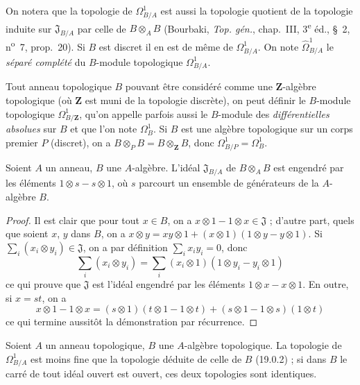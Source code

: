 On notera que la topologie de $\Omega^1_{B/A}$ est aussi la topologie quotient
de la topologie induite sur $\mathfrak{J}_{B/A}$ par celle de
$B\otimes_A B$ (Bourbaki, \emph{Top. gén.}, chap.~III, 3\textsuperscript{e}
éd., §~2, n\textsuperscript{o}~7, prop.~20). Si $B$ est discret il en est de
même de $\Omega^1_{B/A}$. On note $\widehat{\Omega}^1_{B/A}$ le
\emph{séparé complété} du $B$-module topologique $\Omega^1_{B/A}$.

Tout anneau topologique $B$ pouvant être considéré comme une
$\mathbf{Z}$-algèbre topologique (où $\mathbf{Z}$ est muni de la topologie
discrète), on peut définir le $B$-module topologique $\Omega^1_{B/\mathbf{Z}}$,
qu'on appelle parfois aussi le $B$-module des \emph{différentielles absolues}
sur $B$ et que l'on note $\Omega^1_B$. Si $B$ est une algèbre topologique sur
un corps premier $P$ (discret), on a
$B\otimes_P B=B\otimes_{\mathbf{Z}}B$, donc
$\Omega^1_{B/P}=\Omega^1_B$.

\begin{lemma}[20.4.4]
\label{0.20.4.4-fr}
Soient $A$ un anneau, $B$ une $A$-algèbre. L'idéal $\mathfrak{J}_{B/A}$ de
$B\otimes_A B$ est engendré par les éléments $1\otimes s-s\otimes1$, où $s$
parcourt un ensemble de générateurs de la $A$-algèbre $B$.
\end{lemma}

\begin{proof}
Il est clair que pour tout $x\in B$, on a
$x\otimes1-1\otimes x\in\mathfrak{J}$ ; d'autre part, quels que soient $x$,
$y$ dans $B$, on a
$x\otimes y=xy\otimes1+(x\otimes1)(1\otimes y-y\otimes1)$. Si
$\sum_i(x_i\otimes y_i)\in\mathfrak{J}$, on a par définition
$\sum_i x_i y_i=0$, donc
\begin{equation}
\tag{20.4.4.1}
\label{0.20.4.4.1-fr}
  \sum_i(x_i\otimes y_i)=
  \sum_i(x_i\otimes1)(1\otimes y_i-y_i\otimes1)
\end{equation}
ce qui prouve que $\mathfrak{J}$ est l'idéal engendré par les éléments
$1\otimes x-x\otimes1$. En outre, si $x=st$, on a
\begin{equation}
\tag{20.4.4.2}
\label{0.20.4.4.2-fr}
  x\otimes1-1\otimes x=(s\otimes1)(t\otimes1-1\otimes t)
  +(s\otimes1-1\otimes s)(1\otimes t)
\end{equation}
ce qui termine aussitôt la démonstration par récurrence.
\end{proof}

\begin{proposition}[20.4.5]
\label{0.20.4.5-fr}
Soient $A$ un anneau topologique, $B$ une $A$-algèbre topologique. La
topologie de $\Omega^1_{B/A}$ est moins fine que la topologie déduite de celle
de $B$ (19.0.2) ; si dans $B$ le carré de tout idéal ouvert est ouvert, ces
deux topologies sont identiques.
\end{proposition}

